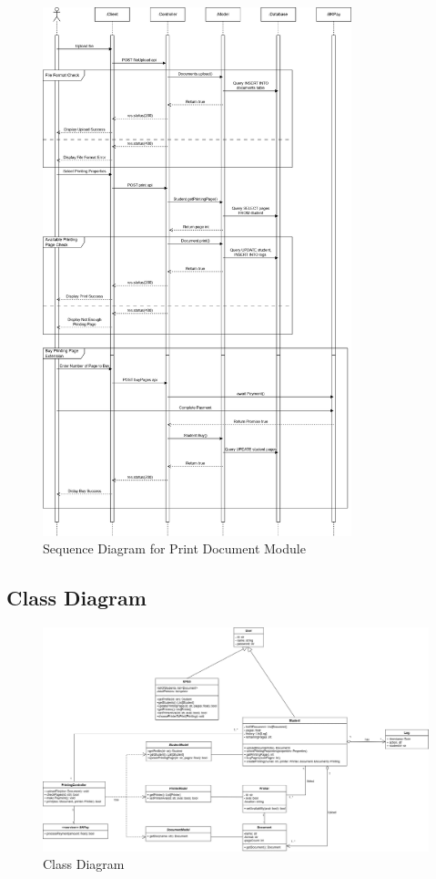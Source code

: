 \begin{figure}[htbp]
    \centering
    \includegraphics[width=0.8\textwidth]{Images/Diagrams/Print_sequence.png}
    \caption{Sequence Diagram for Print Document Module}
\end{figure}

\newpage
\subsection{Class Diagram}

 \begin{figure}[htbp]
     \centering
     \includegraphics[width=1\linewidth]{Images/Diagrams/Class_diagram.png}
     \caption{Class Diagram}
 \end{figure}


